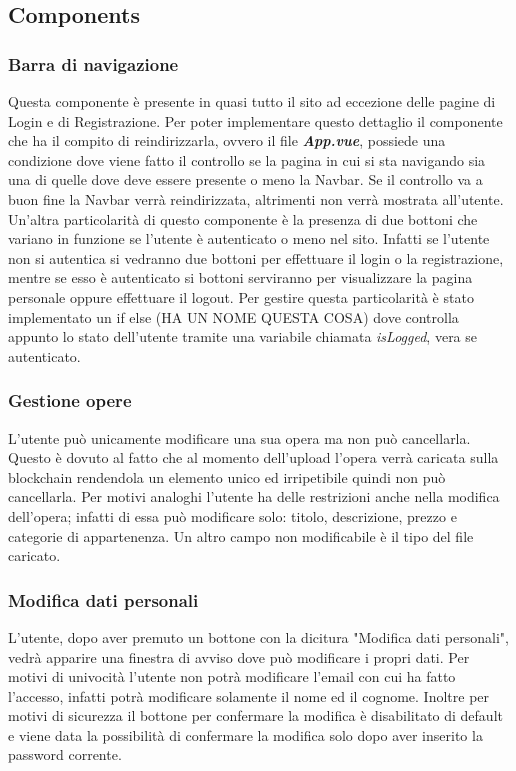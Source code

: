 \subsection{Components}
\subsubsection{Barra di navigazione}
Questa componente è presente in quasi tutto il sito ad eccezione delle pagine di Login e di Registrazione. Per poter implementare questo dettaglio il componente che ha il compito di reindirizzarla, ovvero il file \textbf{\textit{App.vue}}, possiede una condizione dove viene fatto il controllo se la pagina in cui si sta navigando sia una di quelle dove deve essere presente o meno la Navbar. Se il controllo va a buon fine la Navbar verrà reindirizzata, altrimenti non verrà mostrata all'utente.\\
Un'altra particolarità di questo componente è la presenza di due bottoni che variano in funzione se l'utente è autenticato o meno nel sito. Infatti se l'utente non si autentica si vedranno due bottoni per effettuare il login o la registrazione, mentre se esso è autenticato si bottoni serviranno per visualizzare la pagina personale oppure effettuare il logout. Per gestire questa particolarità è stato implementato un if else (HA UN NOME QUESTA COSA) dove controlla appunto lo stato dell'utente tramite una variabile chiamata \textit{isLogged}, vera se autenticato.
\subsubsection{Gestione opere}
L'utente può unicamente modificare una sua opera ma non può cancellarla. Questo è dovuto al fatto che al momento dell'upload l'opera verrà caricata sulla blockchain rendendola un elemento unico ed irripetibile quindi non può cancellarla. Per motivi analoghi l'utente ha delle restrizioni anche nella modifica dell'opera; infatti di essa può modificare solo: titolo, descrizione, prezzo e categorie di appartenenza. Un altro campo non modificabile è il tipo del file caricato.
\subsubsection{Modifica dati personali}
L'utente, dopo aver premuto un bottone con la dicitura "Modifica dati personali", vedrà apparire una finestra di avviso dove può modificare i propri dati. Per motivi di univocità l'utente non potrà modificare l'email con cui ha fatto l'accesso, infatti potrà modificare solamente il nome ed il cognome. Inoltre per motivi di sicurezza il bottone per confermare la modifica è disabilitato di default e viene data la possibilità di confermare la modifica solo dopo aver inserito la password corrente.
